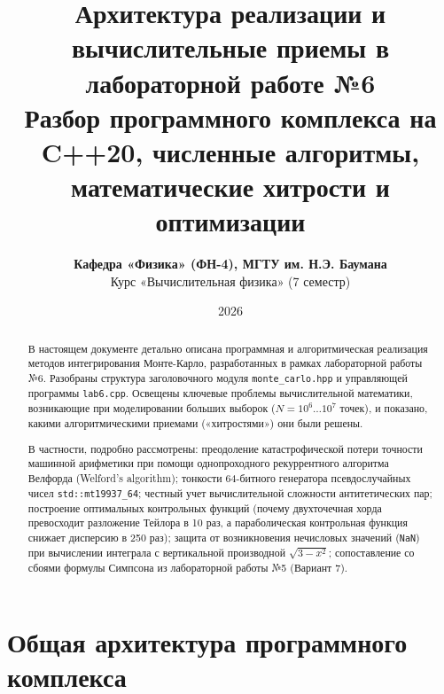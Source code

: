 \documentclass[11pt,a4paper]{article}
\title{\vspace{-10mm}\Huge\bfseries\color{primary} Архитектура реализации и вычислительные приемы в лабораторной работе №6\\[3mm]
\Large\color{secondary} Разбор программного комплекса на C++20, численные алгоритмы, математические хитрости и оптимизации}
\author{\textbf{Кафедра «Физика» (ФН-4), МГТУ им. Н.Э. Баумана}\\
Курс «Вычислительная физика» (7 семестр)}
\date{2026}
\begin{document}
\maketitle

\begin{abstract}
\noindent В настоящем документе детально описана программная и алгоритмическая реализация методов интегрирования Монте-Карло, разработанных в рамках лабораторной работы №6. Разобраны структура заголовочного модуля \texttt{monte\_carlo.hpp} и управляющей программы \texttt{lab6.cpp}. Освещены ключевые проблемы вычислительной математики, возникающие при моделировании больших выборок ($N = 10^6 \dots 10^7$ точек), и показано, какими алгоритмическими приемами («хитростями») они были решены.

В частности, подробно рассмотрены: преодоление катастрофической потери точности машинной арифметики при помощи однопроходного рекуррентного алгоритма Велфорда (Welford's algorithm); тонкости 64-битного генератора псевдослучайных чисел \texttt{std::mt19937\_64}; честный учет вычислительной сложности антитетических пар; построение оптимальных контрольных функций (почему двухточечная хорда превосходит разложение Тейлора в 10 раз, а параболическая контрольная функция снижает дисперсию в 250 раз); защита от возникновения нечисловых значений (\texttt{NaN}) при вычислении интеграла с вертикальной производной $\sqrt{3 - x^2}$; сопоставление со сбоями формулы Симпсона из лабораторной работы №5 (Вариант 7).
\end{abstract}

\tableofcontents
\newpage

\section{Общая архитектура программного комплекса}
\end{document}
